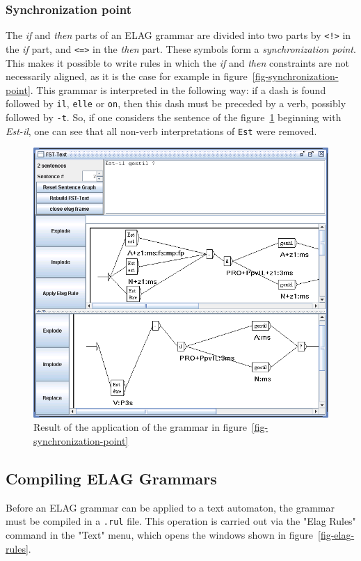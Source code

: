 \subsubsection{Synchronization point}
The \textit{if} and \textit{then} parts of an ELAG grammar are divided into two
parts by \verb+<!>+ in the \textit{if} part, and \verb+<=>+ in the
\textit{then} part. These symbols form a \textit{synchronization point}.
This makes it possible to write rules in which the \textit{if} and
\textit{then} constraints are not necessarily aligned, as it is the
case for example in figure~\ref{fig-synchronization-point}. This grammar is
interpreted in the following way: if a dash is found followed by \verb+il+,
\verb+elle+ or \verb+on+, then this dash must be preceded by a verb, possibly
followed by \verb+-t+. So, if one considers the sentence of the
figure~\ref{fig-est-il} beginning with \textit{Est-il}, one can see 
that all non-verb interpretations of \verb+Est+ were removed.


\begin{figure}[!ht]
\begin{center}
\includegraphics[width=14cm]{resources/img/fig7-15.png}
\caption{Result of the application of the grammar in
figure~\ref{fig-synchronization-point}\label{fig-est-il}}
\end{center}
\end{figure}

\subsection{Compiling ELAG Grammars}
Before an ELAG grammar can be applied to a text automaton, the grammar must be
compiled in a  \verb+.rul+ file.  This operation is
carried out via the "Elag Rules" command in the "Text" menu, which opens the
windows shown in figure~\ref{fig-elag-rules}.

